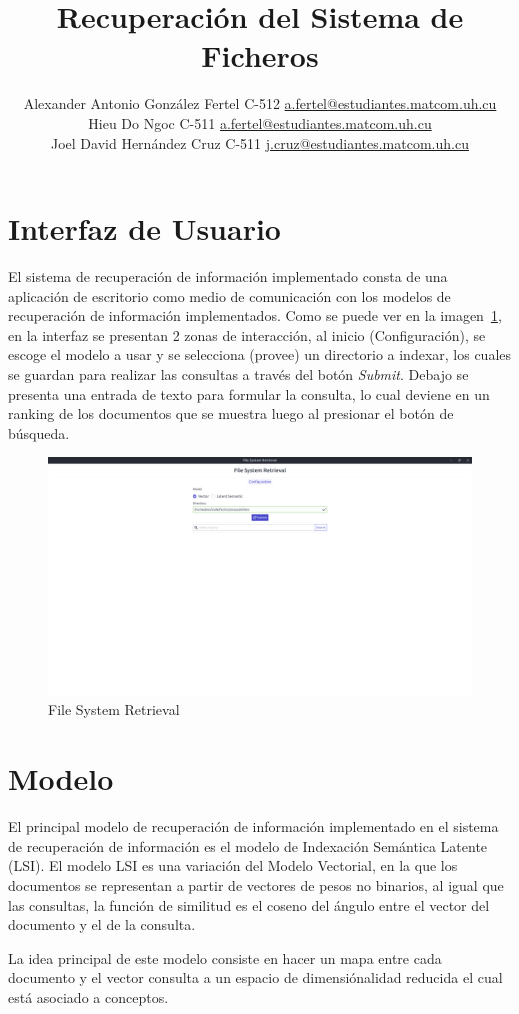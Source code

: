 \documentclass[a4paper, 10pt]{article}
\title{Recuperación del Sistema de Ficheros}
\author{Alexander Antonio González Fertel C-512 \hfill
		\href{mailto:a.fertel@estudiantes.matcom.uh.cu}{a.fertel@estudiantes.matcom.uh.cu}\\
		Hieu Do Ngoc C-511 \hfill
		\href{mailto:a.fertel@estudiantes.matcom.uh.cu}{a.fertel@estudiantes.matcom.uh.cu}\\
		Joel David Hernández Cruz C-511 \hfill
		\href{mailto:j.cruz@estudiantes.matcom.uh.cu}{j.cruz@estudiantes.matcom.uh.cu}}
\date{}
\begin{document}
	\maketitle

	\section{Interfaz de Usuario}
	El sistema de recuperación de información implementado consta de una aplicación de escritorio como medio de comunicación con los modelos
	de recuperación de información implementados. Como se puede ver en la imagen~\ref{fig:1}, en la interfaz se presentan 2 zonas de 
	interacción, al inicio (Configuración), se escoge el modelo a usar y se selecciona (provee) un directorio a indexar, los cuales
	se guardan para realizar las consultas a través del botón \textit{Submit}. Debajo se presenta una entrada
	de texto para formular la consulta, lo cual deviene en un ranking de los documentos que se muestra luego al presionar el botón
	de búsqueda.

	\begin{figure}[h]
		\centering
		\includegraphics[width=.6\textwidth]{images/app.png}			
		\caption{File System Retrieval}
		\label{fig:1}	
	\end{figure}

	\section{Modelo}
	El principal modelo de recuperaci\'on de informaci\'on implementado en el sistema de recuperaci\'on de informaci\'on es 
	el modelo de Indexaci\'on Sem\'antica Latente (LSI). El modelo LSI es una variación del Modelo Vectorial, en la que los
	documentos se representan a partir de vectores de pesos no binarios, al igual que las consultas, la función de similitud
	es el coseno del ángulo entre el vector del documento y el de la consulta.

	La idea principal de este modelo consiste en hacer un mapa entre cada documento y el vector consulta a un espacio 
	de dimensi\'onalidad reducida el cual est\'a asociado a conceptos.
	
\end{document}

